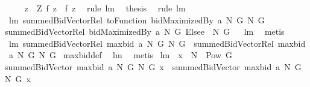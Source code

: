 \begin{isabellebody}
%
\isadelimproof
%
\endisadelimproof
%
\isatagproof
{}\isamarkupfalse%
\ {\isacharminus}\ \isanewline
{}\isamarkupfalse%
\ {\isachardoublequoteopen}{\isasymforall}\ z\ {\isasymin}\ {\isacharquery}Z{\isachardot}\ {\isacharquery}f{}\ z\ {\isacharequal}\ {\isacharquery}f{}\ z{\isachardoublequoteclose}\ \isamarkupfalse%
\ {\isacharparenleft}rule\ lm{}{}{\isacharparenright}\ \isamarkupfalse%
\ {\isacharquery}thesis\ \isamarkupfalse%
\ {\isacharparenleft}rule\ lm{}{}{\isacharparenright}\isanewline
{}\isamarkupfalse%
%
\endisatagproof
{\isafoldproof}%
%
\isadelimproof
\isanewline
%
\endisadelimproof
\isanewline
{}\isamarkupfalse%
\ lm{}{}{\isacharcolon}\ {\isachardoublequoteopen}summedBidVectorRel\ {\isacharparenleft}toFunction\ {\isacharparenleft}bidMaximizedBy\ a\ N\ G{\isacharparenright}{\isacharparenright}\ N\ G\ {\isacharequal}\isanewline
summedBidVectorRel\ {\isacharparenleft}{\isacharparenleft}bidMaximizedBy\ a\ N\ G{\isacharparenright}\ Elsee\ {}{\isacharparenright}\ N\ G{\isachardoublequoteclose}%
\isadelimproof
\ %
\endisadelimproof
%
\isatagproof
{}\isamarkupfalse%
\ lm{}{}\ \isamarkupfalse%
\ metis%
\endisatagproof
{\isafoldproof}%
%
\isadelimproof
%
\endisadelimproof
\isanewline
\isanewline
{}\isamarkupfalse%
\ lm{}{}{\isacharcolon}\ {\isachardoublequoteopen}summedBidVectorRel\ {\isacharparenleft}maxbid{\isacharprime}\ a\ N\ G{\isacharparenright}\ N\ G\ {\isacharequal}\ summedBidVectorRel\ {\isacharparenleft}maxbid\ a\ N\ G{\isacharparenright}\ N\ G{\isachardoublequoteclose}\isanewline
%
\isadelimproof
%
\endisadelimproof
%
\isatagproof
{}\isamarkupfalse%
\ maxbid{\isacharunderscore}def\ \isamarkupfalse%
\ lm{}{}\ \isamarkupfalse%
\ metis%
\endisatagproof
{\isafoldproof}%
%
\isadelimproof
\isanewline
%
\endisadelimproof
\isanewline
{}\isamarkupfalse%
\ lm{}{}{\isacharcolon}\ \ {\isachardoublequoteopen}x\ {\isasymin}\ {\isacharparenleft}N\ {\isasymtimes}\ {\isacharparenleft}Pow\ G\ {\isacharminus}\ {\isacharbraceleft}{\isacharbraceleft}{\isacharbraceright}{\isacharbraceright}{\isacharparenright}{\isacharparenright}{\isachardoublequoteclose}\ \ \isanewline
{\isachardoublequoteopen}summedBidVector{\isacharprime}\ {\isacharparenleft}maxbid{\isacharprime}\ a\ N\ G{\isacharparenright}\ N\ G\ x\ {\isacharequal}\ summedBidVector\ {\isacharparenleft}maxbid\ a\ N\ G{\isacharparenright}\ N\ G\ x{\isachardoublequoteclose}\isanewline

\end{isabellebody}
